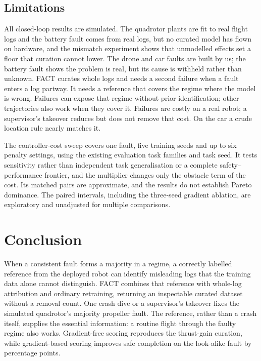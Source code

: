\documentclass[preprint,12pt]{elsarticle}
\newcommand{\method}{FACT}
\begin{document}
\subsection{Limitations}\label{sec:limits}
All closed-loop results are simulated. The quadrotor plants are fit to real flight logs and the battery fault comes from real logs, but no curated model has flown on hardware, and the mismatch experiment shows that unmodelled effects set a floor that curation cannot lower. The drone and car faults are built by us; the battery fault shows the problem is real, but its cause is withheld rather than unknown. \method{} curates whole logs and needs a second failure when a fault enters a log partway. It needs a reference that covers the regime where the model is wrong. Failures can expose that regime without prior identification; other trajectories also work when they cover it. Failures are costly on a real robot; a supervisor's takeover reduces but does not remove that cost. On the car a crude location rule nearly matches it.

The controller-cost sweep covers one fault, five training seeds and up to six penalty settings, using the existing evaluation task families and task seed. It tests sensitivity rather than independent task generalisation or a complete safety--performance frontier, and the multiplier changes only the obstacle term of the cost. Its matched pairs are approximate, and the results do not establish Pareto dominance. The paired intervals, including the three-seed gradient ablation, are exploratory and unadjusted for multiple comparisons.

\section{Conclusion}\label{sec:conclusion}
When a consistent fault forms a majority in a regime, a correctly labelled reference from the deployed robot can identify misleading logs that the training data alone cannot distinguish. \method{} combines that reference with whole-log attribution and ordinary retraining, returning an inspectable curated dataset without a removal count. One crash dive or a supervisor's takeover fixes the simulated quadrotor's majority propeller fault. The reference, rather than a crash itself, supplies the essential information: a routine flight through the faulty regime also works. Gradient-free scoring reproduces the thrust-gain curation, while gradient-based scoring improves safe completion on the look-alike fault by \LookSafeGain{} percentage points.
\end{document}
